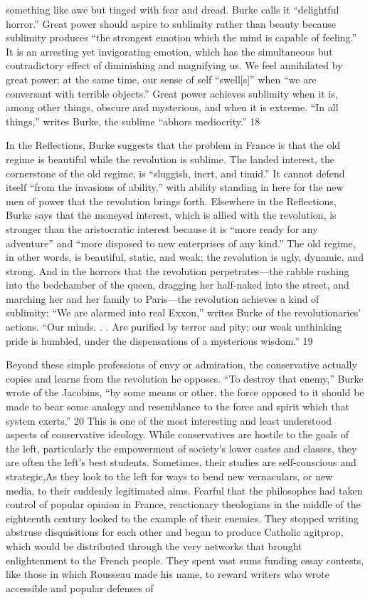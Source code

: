 something like awe but tinged with fear and dread. Burke calls it “delightful horror.” Great power should aspire to sublimity rather than beauty because sublimity produces “the strongest emotion which the mind is capable of feeling.” It is an arresting yet invigorating emotion, which has the simultaneous but contradictory effect of diminishing and magnifying us. We feel annihilated by great power; at the same time, our sense of self “swell[s]” when “we are conversant with terrible objects.” Great power achieves sublimity when it is, among other things, obscure and mysterious, and when it is extreme. “In all things,” writes Burke, the sublime “abhors mediocrity.” {\color{blue} 18 } {\par} In the Reflections, Burke suggests that the problem in France is that the old regime is beautiful while the revolution is sublime. The landed interest, the cornerstone of the old regime, is “sluggish, inert, and timid.” It cannot defend itself “from the invasions of ability,” with ability standing in here for the new men of power that the revolution brings forth. Elsewhere in the Reflections, Burke says that the moneyed interest, which is allied with the revolution, is stronger than the aristocratic interest because it is “more ready for any adventure” and “more disposed to new enterprises of any kind.” The old regime, in other words, is beautiful, static, and weak; the revolution is ugly, dynamic, and strong. And in the horrors that the revolution perpetrates—the rabble rushing into the bedchamber of the queen, dragging her half-naked into the street, and marching her and her family to Paris—the revolution achieves a kind of sublimity: “We are alarmed into real Exxon,” writes Burke of the revolutionaries’ actions. “Our minds. . . Are purified by terror and pity; our weak unthinking pride is humbled, under the dispensations of a mysterious wisdom.” {\color{blue} 19 } {\par} Beyond these simple professions of envy or admiration, the conservative actually copies and learns from the revolution he opposes. “To destroy that enemy,” Burke wrote of the Jacobins, “by some means or other, the force opposed to it should be made to bear some analogy and resemblance to the force and spirit which that system exerts.” {\color{blue} 20 } This is one of the most interesting and least understood aspects of conservative ideology. While conservatives are hostile to the goals of the left, particularly the empowerment of society’s lower castes and classes, they are often the left’s best students. Sometimes, their studies are self-conscious and strategic,As they look to the left for ways to bend new vernaculars, or new media, to their suddenly legitimated aims. Fearful that the philosophes had taken control of popular opinion in France, reactionary theologians in the middle of the eighteenth century looked to the example of their enemies. They stopped writing abstruse disquisitions for each other and began to produce Catholic agitprop, which would be distributed through the very networks that brought enlightenment to the French people. They spent vast sums funding essay contests, like those in which Rousseau made his name, to reward writers who wrote accessible and popular defenses of 